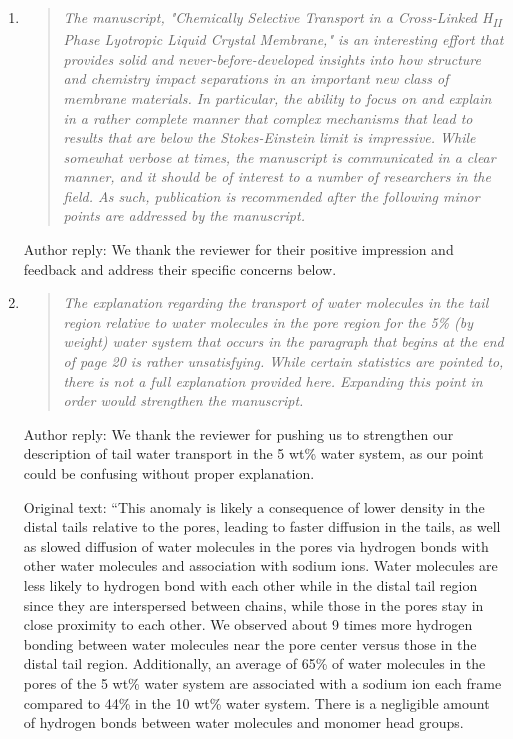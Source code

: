 \documentclass{article}
\begin{document}
\begin{enumerate}
	
    \item \begin{quote} \textit{The manuscript, "Chemically Selective Transport 
    in a Cross-Linked H\textsubscript{II} Phase Lyotropic Liquid Crystal Membrane,"
    is an interesting effort that provides solid and never-before-developed insights
    into how structure and chemistry impact separations in an important new class of
    membrane materials. In particular, the ability to focus on and explain in a 
    rather complete manner that complex mechanisms that lead to results that are 
    below the Stokes-Einstein limit is impressive.  While somewhat verbose at times, 
    the manuscript is communicated in a clear manner, and it should be of interest 
    to a number of researchers in the field. As such, publication is recommended after
    the following minor points are addressed by the manuscript.} 
    \end{quote}
	
    Author reply: We thank the reviewer for their positive impression and feedback 
    and address their specific concerns below. 
	
    \item \begin{quote}
    \textit{The explanation regarding the transport of water molecules in the tail 
    region relative to water molecules in the pore region for the 5\% (by weight) 
    water system that occurs in the paragraph that begins at the end of page 20 is
    rather unsatisfying. While certain statistics are pointed to, there is not a 
    full explanation provided here. Expanding this point in order would strengthen
    the manuscript.}
    \end{quote}

    Author reply: We thank the reviewer for pushing us to strengthen our description
    of tail water transport in the 5 wt\% water system, as our point could be 
    confusing without proper explanation.

    Original text: ``This anomaly is likely a consequence of lower density in the
    distal tails relative to the pores, leading to faster diffusion in the tails,
    as well as slowed diffusion of water molecules in the pores via hydrogen 
    bonds with other water molecules and association with sodium ions. Water molecules are 
    less likely to hydrogen bond with each other while in the distal tail region since they
    are interspersed between chains, while those in the pores stay in close proximity to 
    each other. We observed about 9 times more hydrogen bonding between water molecules 
    near the pore center versus those in the distal tail region. Additionally, an average 
    of 65\% of water molecules in the pores of the 5 wt\% water system are associated
    with a sodium ion each frame compared to 44\% in the 10 wt\% water system. There is a
    negligible amount of hydrogen bonds between water molecules and monomer head groups.
    

\end{enumerate}
\end{document}
